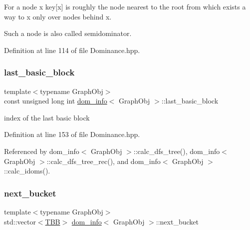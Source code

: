 For a node x key\mbox{[}x\mbox{]} is roughly the node nearest to the root from which exists a way to x only over nodes behind x. 

Such a node is also called semidominator. 

Definition at line 114 of file Dominance.\+hpp.

\mbox{\label{classdom__info_a1361f1a9f7e6317234ca035f253eca11}} 
\subsubsection{\texorpdfstring{last\+\_\+basic\+\_\+block}{last\_basic\_block}}
{\footnotesize\ttfamily template$<$typename Graph\+Obj$>$ \\
const unsigned long int \hyperlink{classdom__info}{dom\+\_\+info}$<$ Graph\+Obj $>$\+::last\+\_\+basic\+\_\+block\hspace{0.3cm}{\ttfamily [private]}}



index of the last basic block 



Definition at line 153 of file Dominance.\+hpp.



Referenced by dom\+\_\+info$<$ Graph\+Obj $>$\+::calc\+\_\+dfs\+\_\+tree(), dom\+\_\+info$<$ Graph\+Obj $>$\+::calc\+\_\+dfs\+\_\+tree\+\_\+rec(), and dom\+\_\+info$<$ Graph\+Obj $>$\+::calc\+\_\+idoms().

\mbox{\label{classdom__info_a20c12ddab8c9f2b2ba0f7427d1afa667}} 
\subsubsection{\texorpdfstring{next\+\_\+bucket}{next\_bucket}}
{\footnotesize\ttfamily template$<$typename Graph\+Obj$>$ \\
std\+::vector$<$\hyperlink{Dominance_8hpp_ac35ffd4ddeccae8225d6ec6f55d65a97}{T\+BB}$>$ \hyperlink{classdom__info}{dom\+\_\+info}$<$ Graph\+Obj $>$\+::next\+\_\+bucket\hspace{0.3cm}{\ttfamily [private]}}



